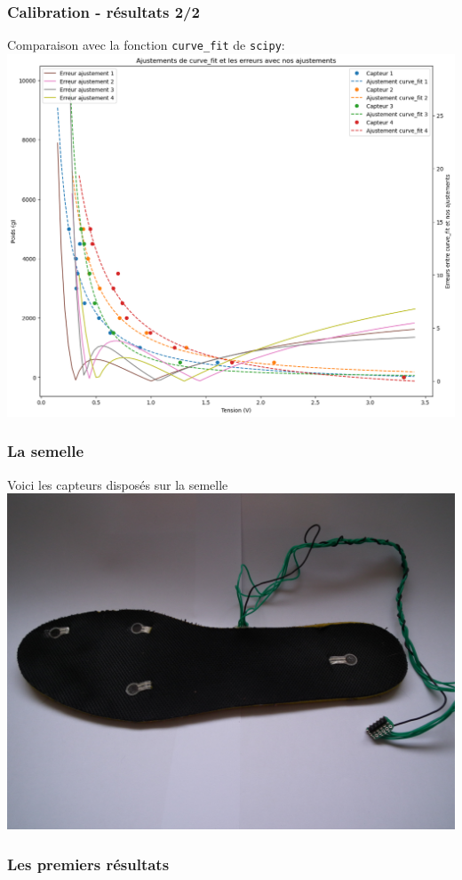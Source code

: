 \begin{frame}
\frametitle{Calibration - résultats 2/2}
Comparaison avec la fonction \texttt{curve\_fit} de \texttt{scipy}:\\
\includegraphics[scale=0.3]{./figures/cal_02.png}
\end{frame}


\begin{frame}
\frametitle{La semelle}
Voici les capteurs disposés sur la semelle
\includegraphics[width=\textwidth]{./figures/sem_00.jpg}

\end{frame}

\begin{frame}
\frametitle{Les premiers résultats}

\end{frame}
